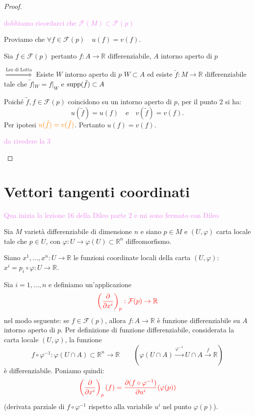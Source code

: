 \begin{proof}
\begin{enumerate}
        \textcolor{violet}{dobbiamo ricordarci che $\mathcal{F}(M) \subset \mathcal{F}(p)$}
        
        Proviamo che $\forall f \in \mathcal{F}(p) \quad u(f) = v(f)$.

        Sia $f \in \mathcal{F}(p)$ pertanto $f : A \to \mathbb{R}$ differenziabile, $A$ intorno aperto di $p$

        $\overset{\text{Lez di Lotta}}{\Rightarrow}$ Esiste $W$ intorno aperto di $p$ $W \subset A$ ed esiste
        $\tilde{f} : M \to \mathbb{R}$ differenziabile tale che $\tilde{f}|_W = f|_W$ e $\operatorname{supp}(\tilde{f}) \subset A$

        Poiché $\tilde{f}, f \in \mathcal{F}(p)$ coincidono su un intorno aperto di $p$, per il punto 2 si ha:
        \[
        u(\tilde{f}) = u(f) \quad \text{e} \quad v(\tilde{f}) = v(f).
        \]
        Per ipotesi $\textcolor{orange}{u(\tilde{f}) = v(\tilde{f})}$. Pertanto $u(f) = v(f)$.

        \textcolor{violet}{da rivedere la 3}
        \end{enumerate}
        \end{proof}


    \section{Vettori tangenti coordinati}
        \textcolor{violet}{Qua inizia la lezione 16 della Dileo parte $2$ e mi sono fermato con Dileo}

        Sia $M$ varietà differenziabile di dimensione $n$ e siano $p \in M$ e $(U, \varphi)$ carta locale tale che $p \in U$, con $\varphi : U \to \varphi(U) \subset \mathbb{R}^n$ diffeomorfismo.
        
        Siano $x^1, \dots, x^n : U \to \mathbb{R}$ le funzioni coordinate locali della carta $(U, \varphi)$: $x^i = p_i \circ \varphi : U \to \mathbb{R}$.

        \begin{definizione}
        \mbox{}

        Sia $i = 1, \dots, n$ e definiamo un'applicazione
        \[
        \textcolor{red}{\left( \frac{\partial}{\partial x^i} \right)_p : \mathcal{F}(p) \to \mathbb{R}}
        \]
        nel modo seguente: se $f \in \mathcal{F}(p)$, allora $f : A \to \mathbb{R}$ è funzione differenziabile su $A$ intorno aperto di $p$. Per definizione di funzione differenziabile, considerata la carta locale $(U, \varphi)$, la funzione
        \[
        f \circ \varphi^{-1} : \varphi(U \cap A) \subset \mathbb{R}^n \to \mathbb{R} \qquad \left( \varphi(U \cap A) \xrightarrow{\varphi^{-1}} U \cap A \xrightarrow{f} \mathbb{R} \right)
        \]
        è differenziabile. Poniamo quindi:
        \[
        \textcolor{red}{\left( \frac{\partial}{\partial x^i} \right)_p (f) = \frac{\partial (f \circ \varphi^{-1})}{\partial u^i} (\varphi(p))}
        \]
        \textcolor{blu}{(derivata parziale di $f \circ \varphi^{-1}$ rispetto alla variabile $u^i$ nel punto $\varphi(p)$)}.
        \end{definizione}


